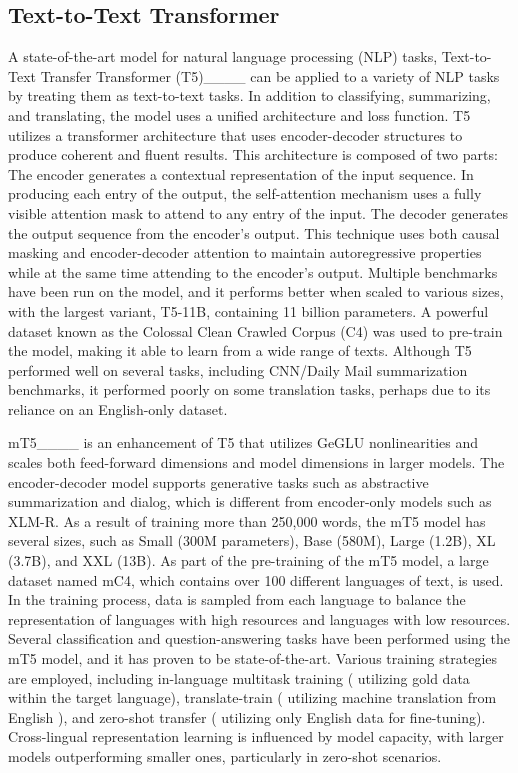 







\subsection{Text-to-Text Transformer}

A state-of-the-art model for natural language processing (NLP) tasks, Text-to-Text Transfer Transformer (T5)____ can be applied to a variety of NLP tasks by treating them as text-to-text tasks. In addition to classifying, summarizing, and translating, the model uses a unified architecture and loss function. T5 utilizes a transformer architecture that uses encoder-decoder structures to produce coherent and fluent results. This architecture is composed of two parts: The encoder generates a contextual representation of the input sequence. In producing each entry of the output, the self-attention mechanism uses a fully visible attention mask to attend to any entry of the input. The decoder generates the output sequence from the encoder's output. This technique uses both causal masking and encoder-decoder attention to maintain autoregressive properties while at the same time attending to the encoder's output. Multiple benchmarks have been run on the model, and it performs better when scaled to various sizes, with the largest variant, T5-11B, containing 11 billion parameters. A powerful dataset known as the Colossal Clean Crawled Corpus (C4) was used to pre-train the model, making it able to learn from a wide range of texts. Although T5 performed well on several tasks, including CNN/Daily Mail summarization benchmarks, it performed poorly on some translation tasks, perhaps due to its reliance on an English-only dataset.

mT5____ is an enhancement of T5 that utilizes GeGLU nonlinearities and scales both feed-forward dimensions and model dimensions in larger models. The encoder-decoder model supports generative tasks such as abstractive summarization and dialog, which is different from encoder-only models such as XLM-R. As a result of training more than 250,000 words, the mT5 model has several sizes, such as Small (300M parameters), Base (580M), Large (1.2B), XL (3.7B), and XXL (13B). As part of the pre-training of the mT5 model, a large dataset named mC4, which contains over 100 different languages of text, is used. In the training process, data is sampled from each language to balance the representation of languages with high resources and languages with low resources.  Several classification and question-answering tasks have been performed using the mT5 model, and it has proven to be state-of-the-art. Various training strategies are employed, including in-language multitask training ( utilizing gold data within the target language), translate-train ( utilizing machine translation from English ), and zero-shot transfer ( utilizing only English data for fine-tuning). Cross-lingual representation learning is influenced by model capacity, with larger models outperforming smaller ones, particularly in zero-shot scenarios.

